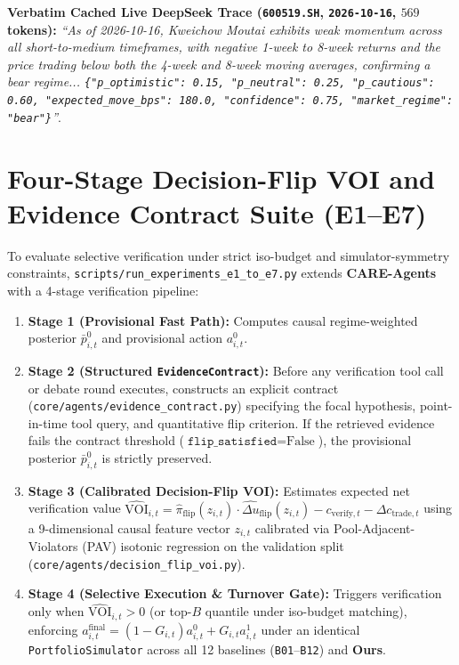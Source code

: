 \documentclass[10pt,a4paper,twocolumn]{article}
\begin{document}
\noindent\textbf{Verbatim Cached Live DeepSeek Trace (\texttt{600519.SH}, \texttt{2026-10-16}, $569$ tokens):} \textit{``As of 2026-10-16, Kweichow Moutai exhibits weak momentum across all short-to-medium timeframes, with negative 1-week to 8-week returns and the price trading below both the 4-week and 8-week moving averages, confirming a bear regime... \texttt{\{"p\_optimistic": 0.15, "p\_neutral": 0.25, "p\_cautious": 0.60, "expected\_move\_bps": 180.0, "confidence": 0.75, "market\_regime": "bear"\}}''}.

\section{Four-Stage Decision-Flip VOI and Evidence Contract Suite (E1--E7)}
\label{app:e1_e7_suite}

To evaluate selective verification under strict iso-budget and simulator-symmetry constraints, \texttt{scripts/run\_experiments\_e1\_to\_e7.py} extends \textbf{CARE-Agents} with a 4-stage verification pipeline:
\begin{enumerate}
  \setlength{\itemsep}{1pt}\setlength{\parskip}{0pt}
  \item \textbf{Stage 1 (Provisional Fast Path):} Computes causal regime-weighted posterior $\bar{p}_{i,t}^0$ and provisional action $a_{i,t}^0$.
  \item \textbf{Stage 2 (Structured \texttt{EvidenceContract}):} Before any verification tool call or debate round executes, constructs an explicit contract (\texttt{core/agents/evidence\_contract.py}) specifying the focal hypothesis, point-in-time tool query, and quantitative flip criterion. If the retrieved evidence fails the contract threshold ($\texttt{flip\_satisfied} = \text{False}$), the provisional posterior $\bar{p}_{i,t}^0$ is strictly preserved.
  \item \textbf{Stage 3 (Calibrated Decision-Flip VOI):} Estimates expected net verification value $\widehat{\text{VOI}}_{i,t} = \hat{\pi}_{\text{flip}}(z_{i,t}) \cdot \widehat{\Delta u}_{\text{flip}}(z_{i,t}) - c_{\text{verify}, t} - \Delta c_{\text{trade}, t}$ using a 9-dimensional causal feature vector $z_{i,t}$ calibrated via Pool-Adjacent-Violators (PAV) isotonic regression on the validation split (\texttt{core/agents/decision\_flip\_voi.py}).
  \item \textbf{Stage 4 (Selective Execution \& Turnover Gate):} Triggers verification only when $\widehat{\text{VOI}}_{i,t} > 0$ (or top-$B$ quantile under iso-budget matching), enforcing $a_{i,t}^{\text{final}} = (1 - G_{i,t}) a_{i,t}^0 + G_{i,t} a_{i,t}^1$ under an identical \texttt{PortfolioSimulator} across all 12 baselines (\texttt{B01}--\texttt{B12}) and \textbf{Ours}.
\end{enumerate}
\end{document}
